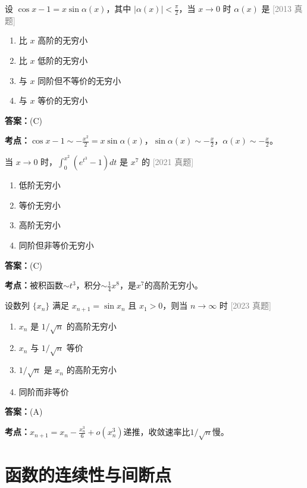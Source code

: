 \documentclass[12pt,a4paper]{ctexbook}
\newcommand{\src}[1]{\hfill\textcolor{gray}{\small\textsf{[#1]}}}
\newcommand{\ans}[1]{\begin{answerbox}\textbf{答案：}#1\end{answerbox}}
\newcommand{\kpt}[1]{\textbf{考点：}#1}
\begin{document}
\begin{exercise}[2013 数学二]
设 $\cos x-1=x\sin\alpha(x)$，其中 $|\alpha(x)|<\frac{\pi}{2}$，当 $x\to 0$ 时 $\alpha(x)$ 是 \hfill\src{2013 真题}
\begin{enumerate}[label=(\Alph*),nosep]
  \item 比 $x$ 高阶的无穷小
  \item 比 $x$ 低阶的无穷小
  \item 与 $x$ 同阶但不等价的无穷小
  \item 与 $x$ 等价的无穷小
\end{enumerate}
\end{exercise}
\ans{(C)}
\kpt{$\cos x-1\sim -\frac{x^2}{2}=x\sin\alpha(x)$，$\sin\alpha(x)\sim -\frac{x}{2}$，$\alpha(x)\sim -\frac{x}{2}$。}

\bigskip

\begin{exercise}[2021 数学二]
当 $x\to 0$ 时，$\int_0^{x^2}(e^{t^3}-1)dt$ 是 $x^7$ 的 \hfill\src{2021 真题}
\begin{enumerate}[label=(\Alph*),nosep]
  \item 低阶无穷小
  \item 等价无穷小
  \item 高阶无穷小
  \item 同阶但非等价无穷小
\end{enumerate}
\end{exercise}
\ans{(C)}
\kpt{被积函数$\sim t^3$，积分$\sim\frac{1}{4}x^8$，是$x^7$的高阶无穷小。}

\bigskip

\begin{exercise}[2023 数学二·第3题]
设数列 $\{x_n\}$ 满足 $x_{n+1}=\sin x_n$ 且 $x_1>0$，则当 $n\to\infty$ 时 \hfill\src{2023 真题}
\begin{enumerate}[label=(\Alph*),nosep]
  \item $x_n$ 是 $1/\sqrt{n}$ 的高阶无穷小
  \item $x_n$ 与 $1/\sqrt{n}$ 等价
  \item $1/\sqrt{n}$ 是 $x_n$ 的高阶无穷小
  \item 同阶而非等价
\end{enumerate}
\end{exercise}
\ans{(A)}
\kpt{$x_{n+1}=x_n-\frac{x_n^3}{6}+o(x_n^3)$递推，收敛速率比$1/\sqrt{n}$慢。}

\section{函数的连续性与间断点}
\end{document}
